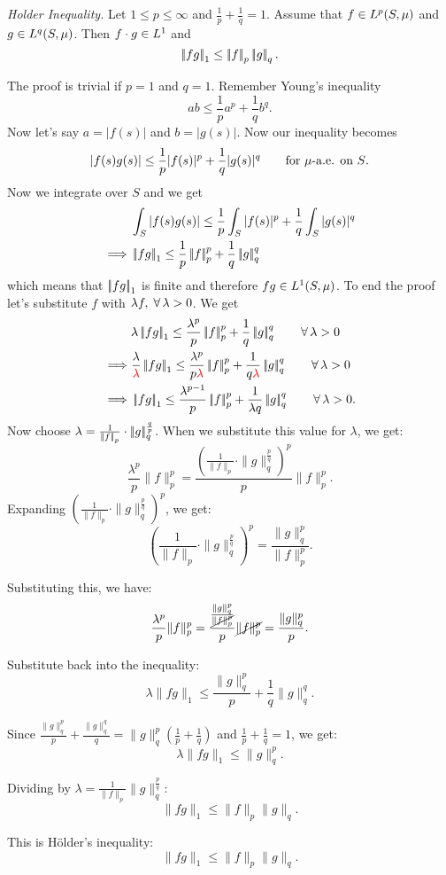 \documentclass{article}
\begin{document}
\begin{theorem}
    \emph{Holder Inequality.} Let $1\leq p\leq\infty$ and $\frac{1}{p}+\frac{1}{q}=1$. Assume that $f\in L^{p}(S,\mu)$ and $g\in L^{q}(S,\mu)$. Then $f\cdot g\in L^{1}$ and
    \begin{equation*}
        \left|\negthinspace\left|fg\right|\negthinspace\right|_1\leq\left|\negthinspace\left|f\right|\negthinspace\right|_p\left|\negthinspace\left|g\right|\negthinspace\right|_q.
    \end{equation*}
\end{theorem}
\begin{fancyproof}
    The proof is trivial if $p=1$ and $q=1$. Remember Young's inequality 
    \[
    ab\leq\frac{1}{p}a^p+\frac{1}{q}b^q.
    \]
    Now let's say $a=|f(s)|$ and $b=|g(s)|$. Now our inequality becomes
    \[
    |f(s)g(s)|\leq\frac{1}{p}|f(s)|^p+\frac{1}{q}|g(s)|^q\qquad\text{for $\mu$-a.e. on $S$}.
    \]
    Now we integrate over $S$ and we get
    \begin{align*}
        &\int_S|f(s)g(s)|\leq\frac{1}{p}\int_S|f(s)|^p+\frac{1}{q}\int_S|g(s)|^q\\
        \implies&\left|\negthinspace\left|fg\right|\negthinspace\right|_1\leq\frac{1}{p}\left|\negthinspace\left|f\right|\negthinspace\right|_p^p+\frac{1}{q}\left|\negthinspace\left|g\right|\negthinspace\right|_q^q
    \end{align*}
    which means that $\left|\negthinspace\left|fg\right|\negthinspace\right|_1$ is finite and therefore $fg\in L^{1}(S,\mu)$. To end the proof let's substitute $f$ with $\lambda f,\;\forall\,\lambda>0$. We get
    \begin{align*}
        &\lambda\norm{fg}_1\leq\frac{\lambda^p}{p}\norm{f}_p^p+\frac{1}{q}\norm{g}_q^q\qquad\every\lambda>0\\
        \implies&\frac{\lambda}{\color{red}\lambda}\norm{fg}_1\leq\frac{\lambda^p}{p\color{red}\lambda}\norm{f}_p^p+\frac{1}{q\color{red}\lambda}\norm{g}_q^q\qquad\every\lambda>0\\
        \implies&\norm{fg}_1\leq\frac{\lambda^{p-1}}{p}\norm{f}_p^p+\frac{1}{\lambda q}\norm{g}_q^q\qquad\every\lambda>0.\\
    \end{align*}
    Now choose $\lambda=\frac{1}{\left|\negthinspace\left|f\right|\negthinspace\right|_p}\cdot\left|\negthinspace\left|g\right|\negthinspace\right|^{\frac{q}{p}}_q$. When we substitute this value for \( \lambda \), we get:
    \[
\frac{\lambda^p}{p} \|f\|_p^p = \frac{\left( \frac{1}{\|f\|_p} \cdot \|g\|_q^{\frac{p}{q}} \right)^p}{p} \|f\|_p^p.
\]
Expanding \( \left( \frac{1}{\|f\|_p} \cdot \|g\|_q^{\frac{p}{q}} \right)^p \), we get:
\[
\left( \frac{1}{\|f\|_p} \cdot \|g\|_q^{\frac{p}{q}} \right)^p = \frac{\|g\|_q^p}{\|f\|_p^p}.
\]

Substituting this, we have:
\[
\frac{\lambda^p}{p} \|f\|_p^p = \frac{\frac{\|g\|_q^p}{\cancel{\|f\|_p^p}}}{p} \cancel{\|f\|_p^p} = \frac{\|g\|_q^p}{p}.
\]

Substitute back into the inequality:
\[
\lambda \|fg\|_1 \leq \frac{\|g\|_q^p}{p} + \frac{1}{q} \|g\|_q^q.
\]

Since \( \frac{\|g\|_q^p}{p} + \frac{\|g\|_q^q}{q} = \|g\|_q^p \left( \frac{1}{p} + \frac{1}{q} \right) \) and \( \frac{1}{p} + \frac{1}{q} = 1 \), we get:
\[
\lambda \|fg\|_1 \leq \|g\|_q^p.
\]


Dividing by \( \lambda = \frac{1}{\|f\|_p} \|g\|_q^{\frac{p}{q}} \):
\[
\|fg\|_1 \leq \|f\|_p \|g\|_q.
\]

This is Hölder’s inequality:
\[
\|fg\|_1 \leq \|f\|_p \|g\|_q.
\]

\end{fancyproof}
\end{document}
